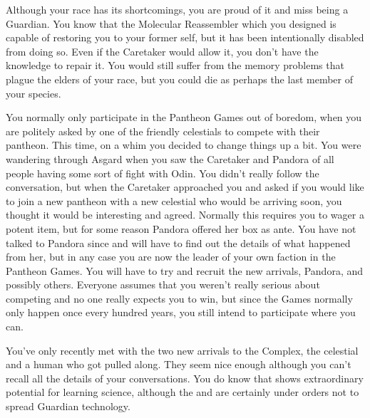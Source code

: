 \documentclass[char]{guardians}
\begin{document}
Although your race has its shortcomings, you are proud of it and miss being a Guardian. You know that the Molecular Reassembler which you designed is capable of restoring you to your former self, but it has been intentionally disabled from doing so. Even if the Caretaker would allow it, you don't have the knowledge to repair it. You would still suffer from the memory problems that plague the elders of your race, but you could die as perhaps the last member of your species.

You normally only participate in the Pantheon Games out of boredom, when you are politely asked by one of the friendly celestials to compete with their pantheon. This time, on a whim you decided to change things up a bit. You were wandering through Asgard when you saw the Caretaker and Pandora of all people having some sort of fight with Odin. You didn't really follow the conversation, but when the Caretaker approached you and asked if you would like to join a new pantheon with a new celestial who would be arriving soon, you thought it would be interesting and agreed. Normally this requires you to wager a potent item, but for some reason Pandora offered her box as ante. You have not talked to Pandora since and will have to find out the details of what happened from her, but in any case you are now the leader of your own faction in the Pantheon Games. You will have to try and recruit the new arrivals, Pandora, and possibly others. Everyone assumes that you weren't really serious about competing and no one really expects you to win, but since the Games normally only happen once every hundred years, you still intend to participate where you can.

You've only recently met with the two new arrivals to the Complex, the celestial \cUnity{} and a human \cKachiko{\intro} who got pulled along. They seem nice enough although you can't recall all the details of your conversations. You do know that \cKachiko{} shows extraordinary potential for learning science, although the \cCaretaker{} and \cWarden{} are certainly under orders not to spread Guardian technology.
\end{document}
